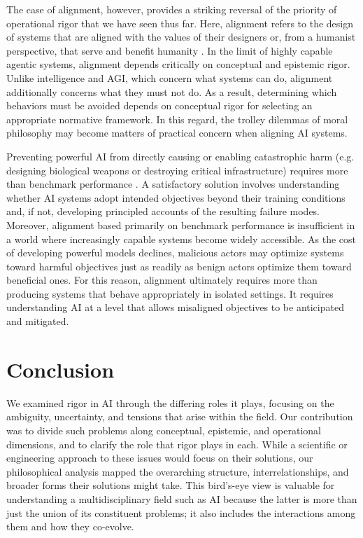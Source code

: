 \documentclass{article}
\begin{document}
The case of alignment, however, provides a striking reversal of the priority of operational rigor that we have seen thus far.
Here, alignment refers to the design of systems that are aligned with the values of their designers or, from a humanist perspective, that serve and benefit humanity \cite{Russell2019HumanCompatible, Gabriel2020ValuesAlignment}.
In the limit of highly capable agentic systems, alignment depends critically on conceptual and epistemic rigor.
Unlike intelligence and AGI, which concern what systems can do, alignment additionally concerns what they must not do.
As a result, determining which behaviors must be avoided depends on conceptual rigor for selecting an appropriate normative framework.
In this regard, the trolley dilemmas of moral philosophy may become matters of practical concern when aligning AI systems.

Preventing powerful AI from directly causing or enabling catastrophic harm (e.g. designing biological weapons or destroying critical infrastructure) requires more than benchmark performance \cite{shah2025approachtechnicalagisafety}.
A satisfactory solution involves understanding whether AI systems adopt intended objectives beyond their training conditions \cite{langosco2022_goal_misgeneralization_rl, hubinger2019risks} and, if not, developing principled accounts of the resulting failure modes.
Moreover, alignment based primarily on benchmark performance is insufficient in a world where increasingly capable systems become widely accessible.
As the cost of developing powerful models declines, malicious actors may optimize systems toward harmful objectives just as readily as benign actors optimize them toward beneficial ones.
For this reason, alignment ultimately requires more than producing systems that behave appropriately in isolated settings.
It requires understanding AI at a level that allows misaligned objectives to be anticipated and mitigated.





\section{Conclusion}

We examined rigor in AI through the differing roles it plays, focusing on the ambiguity, uncertainty, and tensions that arise within the field.
Our contribution was to divide such problems along conceptual, epistemic, and operational dimensions, and to clarify the role that rigor plays in each.
While a scientific or engineering approach to these issues would focus on their solutions, our philosophical analysis mapped the overarching structure, interrelationships, and broader forms their solutions might take.
This bird’s-eye view is valuable for understanding a multidisciplinary field such as AI because the latter is more than just the union of its constituent problems; it also includes the interactions among them and how they co-evolve.
\end{document}
